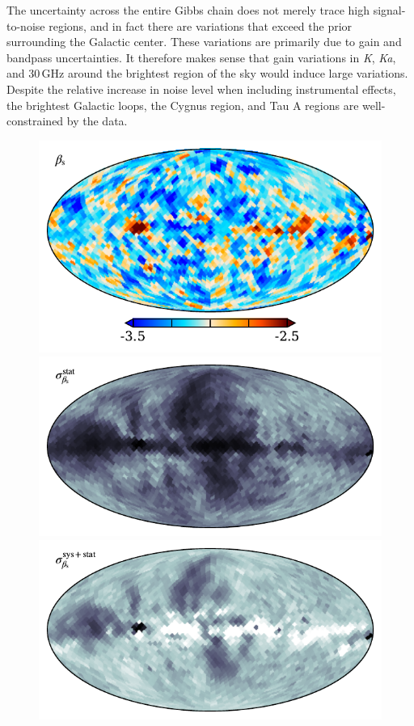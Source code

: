 \documentclass[twocolumn]{../../common/aa}
\newcommand{\K}[0]{\textit K}
\newcommand{\Ka}[0]{\textit{Ka}}
\begin{document}
The uncertainty across the entire Gibbs chain does not merely trace high signal-to-noise regions, and in fact there are variations that exceed the prior surrounding the Galactic center. These variations are primarily due to gain and bandpass uncertainties. It therefore makes sense that gain variations in \K, \Ka, and 30\,GHz around the brightest region of the sky would induce large variations. Despite the relative increase in noise level when including instrumental effects, the brightest Galactic loops, the Cygnus region, and Tau A regions are well-constrained by the data.


\begin{figure}
	\centering
	\includegraphics[width=\columnwidth]{figures/beta_n0016_mu.pdf}\\
	\includegraphics[width=\columnwidth]{figures/beta_n0016_sd_samp.pdf}\\
	\includegraphics[width=\columnwidth]{figures/beta_n0016_sd_stat_inst.pdf}\\

\end{figure}
\end{document}

